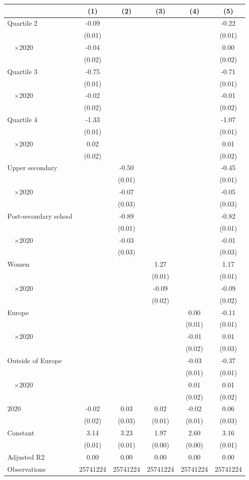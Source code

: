 
\begin{tabular}{@{}l*{5}{S[table-format={-}2.2{\tnote{***}}]}@{}}
\toprule
{} & {(1)} & {(2)} & {(3)} & {(4)} & {(5)}\tabularnewline%
\midrule
Quartile 2 & -0.09\tnote{***} &  &  &  & -0.22\tnote{***}\tabularnewline%
 & (0.01) &  &  &  & \vphantom{2} (0.01)\tabularnewline%
~~\(\times 2020\) & -0.04 &  &  &  & 0.00\tabularnewline%
 & (0.02) &  &  &  & \vphantom{2} (0.02)\tabularnewline%
Quartile 3 & -0.75\tnote{***} &  &  &  & -0.71\tnote{***}\tabularnewline%
 & (0.01) &  &  &  & \vphantom{1} (0.01)\tabularnewline%
~~\(\times 2020\) & -0.02 &  &  &  & -0.01\tabularnewline%
 & (0.02) &  &  &  & \vphantom{1} (0.02)\tabularnewline%
Quartile 4 & -1.33\tnote{***} &  &  &  & -1.07\tnote{***}\tabularnewline%
 & (0.01) &  &  &  & (0.01)\tabularnewline%
~~\(\times 2020\) & 0.02 &  &  &  & 0.01\tabularnewline%
 & (0.02) &  &  &  & (0.02)\tabularnewline%
Upper secondary &  & -0.50\tnote{***} &  &  & -0.45\tnote{***}\tabularnewline%
 &  & (0.01) &  &  & \vphantom{1} (0.01)\tabularnewline%
~~\(\times 2020\) &  & -0.07\tnote{*} &  &  & -0.05\tnote{\dagger}\tabularnewline%
 &  & (0.03) &  &  & \vphantom{1} (0.03)\tabularnewline%
Post-secondary school &  & -0.89\tnote{***} &  &  & -0.82\tnote{***}\tabularnewline%
 &  & (0.01) &  &  & (0.01)\tabularnewline%
~~\(\times 2020\) &  & -0.03 &  &  & -0.01\tabularnewline%
 &  & (0.03) &  &  & (0.03)\tabularnewline%
Women &  &  & 1.27\tnote{***} &  & 1.17\tnote{***}\tabularnewline%
 &  &  & (0.01) &  & (0.01)\tabularnewline%
~~\(\times 2020\) &  &  & -0.09\tnote{***} &  & -0.09\tnote{***}\tabularnewline%
 &  &  & (0.02) &  & (0.02)\tabularnewline%
Europe &  &  &  & 0.00 & -0.11\tnote{***}\tabularnewline%
 &  &  &  & (0.01) & \vphantom{1} (0.01)\tabularnewline%
~~\(\times 2020\) &  &  &  & -0.01 & 0.01\tabularnewline%
 &  &  &  & (0.02) & (0.03)\tabularnewline%
Outside of Europe &  &  &  & -0.03\tnote{*} & -0.37\tnote{***}\tabularnewline%
 &  &  &  & (0.01) & (0.01)\tabularnewline%
~~\(\times 2020\) &  &  &  & 0.01 & 0.01\tabularnewline%
 &  &  &  & (0.02) & (0.02)\tabularnewline%
\midrule
\(2020\) & -0.02 & 0.03 & 0.02\tnote{*} & -0.02\tnote{**} & 0.06\tnote{*}\tabularnewline%
 & (0.02) & (0.03) & (0.01) & (0.01) & (0.03)\tabularnewline%
Constant & 3.14\tnote{***} & 3.23\tnote{***} & 1.97\tnote{***} & 2.60\tnote{***} & 3.16\tnote{***}\tabularnewline%
 & (0.01) & (0.01) & (0.00) & (0.00) & (0.01)\tabularnewline%
\midrule
Adjusted R2 & 0.00 & 0.00 & 0.00 & 0.00 & 0.00\tabularnewline%
Observations & {\num{25741224}} & {\num{25741224}} & {\num{25741224}} & {\num{25741224}} & {\num{25741224}}\tabularnewline%
\bottomrule
\end{tabular}
